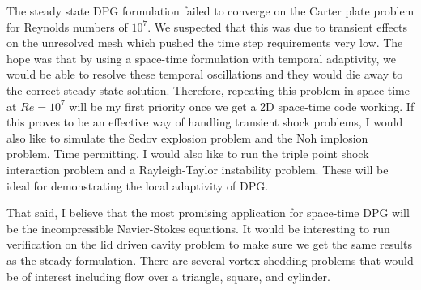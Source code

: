 \documentclass[letterpaper]{article}
\begin{document}
The steady state DPG formulation failed to converge on the Carter plate problem for Reynolds numbers of $10^7$. 
We suspected that this was due to transient effects on the unresolved mesh which pushed the time step requirements very low.
The hope was that by using a space-time formulation with temporal adaptivity, we would be able to resolve these temporal oscillations
and they would die away to the correct steady state solution.
Therefore, repeating this problem in space-time at $Re=10^7$ will be my first priority once we get a 2D space-time code working.
If this proves to be an effective way of handling transient shock problems, 
I would also like to simulate the Sedov explosion problem and the Noh implosion problem.
Time permitting, I would also like to run the triple point shock interaction problem and a Rayleigh-Taylor instability problem.
These will be ideal for demonstrating the local adaptivity of DPG.

That said, I believe that the most promising application for space-time DPG will be the incompressible Navier-Stokes equations.
It would be interesting to run verification on the lid driven cavity problem to make sure we get the same results as the steady formulation.
There are several vortex shedding problems that would be of interest including flow over a triangle, square, and cylinder.




\end{document}
